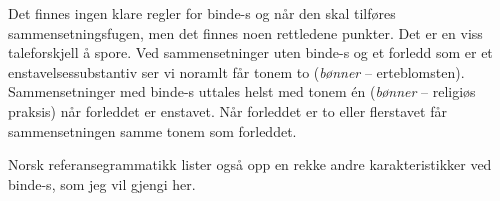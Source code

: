 Det finnes ingen klare regler for binde-s og når den skal tilføres  sammensetningsfugen, men det finnes noen rettledene punkter. Det er en viss taleforskjell å spore. Ved sammensetninger uten binde-s og et forledd som er et enstavelsessubstantiv ser vi noramlt får tonem to (\textit{bønner} -- erteblomsten). Sammensetninger med binde-s uttales helst med tonem én (\textit{bønner} -- religiøs praksis) når forleddet er enstavet. Når forleddet er to eller flerstavet får sammensetningen samme tonem som forleddet.

Norsk referansegrammatikk \cite{faarlund1997norsk} lister også opp en rekke andre karakteristikker ved binde-s, som jeg vil gjengi her.

